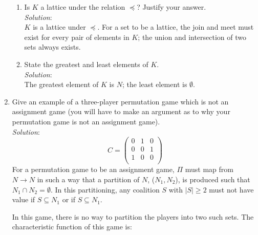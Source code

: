 \documentclass{article}
\begin{document}
\begin{enumerate}
\begin{enumerate}
    \item Is $K$ a lattice under the relation $\preceq$? Justify your answer. \\

    \textit{Solution}: \\
    $K$ is a lattice under $\preceq$. For a set to be a lattice, the join and meet must exist for every pair of elements in $K$; the union and intersection of two sets always exists. \\

    \item State the greatest and least elements of $K$. \\

    \textit{Solution}: \\
    The greatest element of $K$ is $N$; the least element is $\emptyset$. \\

    \end{enumerate}
%
\newpage
\item Give an example of a three-player permutation game which is not an assignment game (you will have to make an argument as to why your permutation game is not an assignment game). \\

\textit{Solution}: \\
\[
C = \begin{pmatrix}
    0 & 1 & 0 \\
    0 & 0 & 1 \\
    1 & 0 & 0 \\
\end{pmatrix}
\]
For a permutation game to be an assignment game, $\Pi$ must map from $N \rightarrow N$ in such a way that a partition of $N$, ($N_{1}, N_{2}$), is produced such that $N_{1} \cap N_{2} = \emptyset$. In this partitioning, any coalition $S$ with $|S| \ge 2$ must not have value if $S \subseteq N_{1}$ or if $S \subseteq N_{1}$. 

In this game, there is no way to partition the players into two such sets. The characteristic function of this game is: \\


\end{enumerate}
\end{document}
